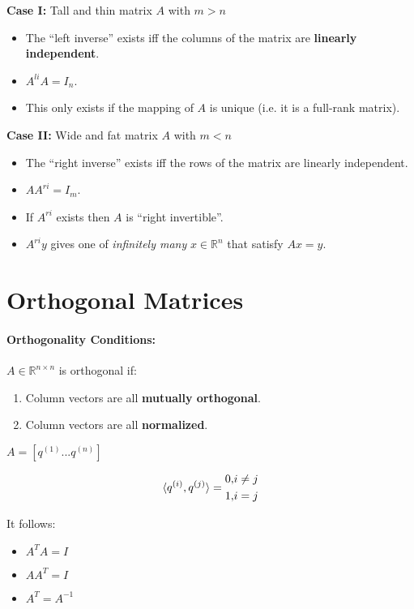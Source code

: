 \documentclass[a4paper,12pt]{report}
\DeclarePairedDelimiter\inpr{\langle}{\rangle}%
\def\reals{\mathbb{R}}
\begin{document}
\textbf{Case I: } Tall and thin matrix $A$ with $m > n$
\begin{itemize}
\item The ``left inverse'' exists iff the columns of the matrix are \textbf{linearly independent}.
\item $A^{li} A = I_n$.
\item This only exists if the mapping of $A$ is unique (i.e. it is a full-rank matrix).
\end{itemize}


\textbf{Case II: } Wide and fat matrix $A$ with $m < n$
\begin{itemize}
\item The ``right inverse'' exists iff the rows of the matrix are linearly independent.
\item $A A^{ri} = I_m$.
\item If $A^{ri}$ exists then $A$ is ``right invertible''.
\item $A^{ri} y$ gives one of \textit{infinitely many} $x\in \reals^n$ that satisfy $Ax = y$.
\end{itemize}



\section{Orthogonal Matrices}

\paragraph{Orthogonality Conditions: } $A\in \reals^{n\times n}$ is orthogonal if:
\begin{enumerate}
\item Column vectors are all \textbf{mutually orthogonal}.
\item Column vectors are all \textbf{normalized}.
\end{enumerate}

$A = [q^{(1)} ... q^{(n)}]$

\begin{equation}
\inpr{q^{(i)}, q^{(j)}} = \begin{split}
0, & i \neq j \\
1, & i = j 
\end{split}
\end{equation}

It follows: 
\begin{itemize}
\item $A^TA = I$
\item $AA^T = I$
\item $A^T = A^{-1}$
\end{itemize}
\end{document}
